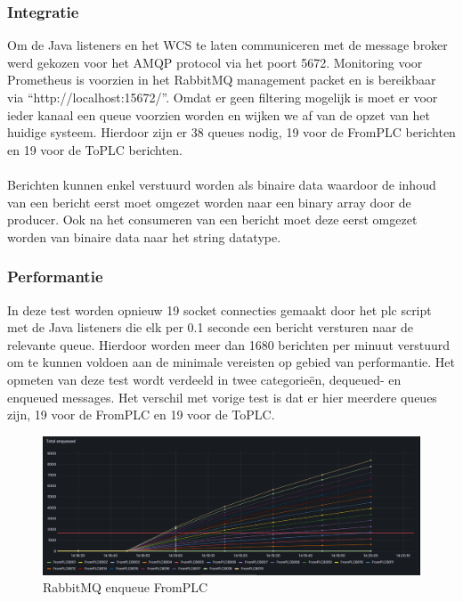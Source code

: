 \subsubsection{Integratie}
Om de Java listeners en het WCS te laten communiceren met de message broker werd gekozen voor het AMQP protocol via het poort 5672.
Monitoring voor Prometheus is voorzien in het RabbitMQ management packet en is bereikbaar via ``http://localhost:15672/''.
Omdat er geen filtering mogelijk is moet er voor ieder kanaal een queue voorzien worden en wijken we af van de opzet van het huidige systeem.
Hierdoor zijn er 38 queues nodig, 19 voor de FromPLC berichten en 19 voor de ToPLC berichten.
\\\\
Berichten kunnen enkel verstuurd worden als binaire data waardoor de inhoud van een bericht eerst moet omgezet worden naar een binary array door de producer.
Ook na het consumeren van een bericht moet deze eerst omgezet worden van binaire data naar het string datatype.

\subsubsection{Performantie}
In deze test worden opnieuw 19 socket connecties gemaakt door het plc script met de Java listeners die elk per 0.1 seconde een bericht versturen naar de relevante queue.
Hierdoor worden meer dan 1680 berichten per minuut verstuurd om te kunnen voldoen aan de minimale vereisten op gebied van performantie.
Het opmeten van deze test wordt verdeeld in twee categorieën, dequeued- en enqueued messages.
Het verschil met vorige test is dat er hier meerdere queues zijn, 19 voor de FromPLC en 19 voor de ToPLC. 

\begin{figure}[h!]
  \centering
  \includegraphics[width=.95\textwidth]{img/rabbitmq-enqueue-count-FromPLC.png}
  \caption{\label{fig:rabbitmq_enqueue_fromplc_count}RabbitMQ enqueue FromPLC}
\end{figure}

